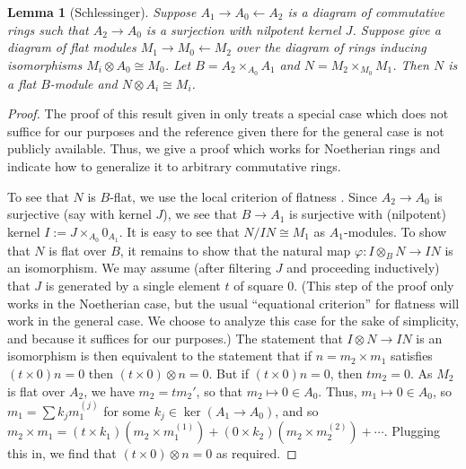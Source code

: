 \documentclass[11pt]{amsart}
\renewcommand{\phi}{\varphi}
\renewcommand{\[}{[\!\hspace{0.03em}[}
\renewcommand{\]}{]\!\hspace{0.03em}]}
\renewcommand{\(}{(\!\hspace{0.03em}(}
\renewcommand{\)}{)\!\hspace{0.03em})}
\DeclareMathOperator*{\tensor}{\otimes}
\newtheorem{lem}{Lemma}[subsubsection]%
\theoremstyle{definition}
\theoremstyle{remark}
\begin{document}
\begin{lem}[Schlessinger]\label{L:schlessinger} Suppose $A_{1}\to A_{0}\leftarrow A_{2}$ is a diagram of commutative 
rings such that $A_{2}\to A_{0}$ is a surjection with nilpotent kernel $J$.  
Suppose give a diagram of flat modules $M_{1}\to M_{0}\leftarrow M_{2}$ 
over the diagram of rings inducing isomorphisms $M_{i}\tensor A_{0}\cong 
M_{0}$.  Let $B=A_{2}\times_{A_{0}}A_{1}$ and 
$N=M_{2}\times_{M_{0}}M_{1}$.  Then $N$ is a flat $B$-module and 
$N\tensor A_{i}\cong M_{i}$.
\end{lem}
\begin{proof} The proof of this result given in \cite{schl} only treats 
a special case which does not 
suffice for our purposes and the reference given there for the general 
case is not publicly available.  Thus, we give a proof which works for 
Noetherian rings and indicate how to generalize it to arbitrary 
commutative rings.

    To see that $N$ is $B$-flat, we use the local criterion of flatness 
\cite[\S22]{matsumura}.  Since $A_{2}\to A_{0}$ is surjective (say with kernel 
$J$), we see that $B\to A_{1}$ is surjective with (nilpotent) kernel 
$I:=J\times_{A_{0}}0_{A_{1}}$.  It is easy to see that $N/IN\cong M_{1}$ 
as $A_{1}$-modules.  To show that $N$ is flat over $B$, it remains to 
show that the natural map $\phi:I\tensor_{B} N\to IN$ is an isomorphism.  
We may assume (after filtering $J$ and proceeding inductively) that 
$J$ is generated by a single element $t$ of square $0$.  (This step 
of the proof only works in the Noetherian case, but the usual 
``equational criterion'' for flatness \cite[7.6]{matsumura} will work in the general 
case.  We choose to analyze this case for the sake of simplicity, and 
because it suffices for our purposes.)
The 
statement that $I\tensor N\to IN$ is an isomorphism is then 
equivalent to the statement that if $n=m_{2}\times m_{1}$ satisfies 
$(t\times 0)n=0$ then $(t\times 0)\tensor n=0$.  But if $(t\times 
0)n=0$, then $tm_{2}=0$.  As $M_{2}$ is flat over $A_{2}$, we have 
$m_{2}=tm_{2}'$, so that $m_{2}\mapsto 0\in A_{0}$.  Thus, 
$m_{1}\mapsto 0\in A_{0}$, so $m_{1}=\sum k_{j}m^{(j)}_{1}$ for some 
$k_{j}\in\ker(A_{1}\to A_{0})$, and so $m_{2}\times m_{1}=(t\times 
k_{1})(m_{2}\times m^{(1)}_{1})+(0\times k_{2})(m_{2}\times 
m^{(2)}_{2})+\cdots$.  Plugging this in, we find that $(t\times 
0)\otimes n=0$ as required.
\end{proof}
\end{document}

